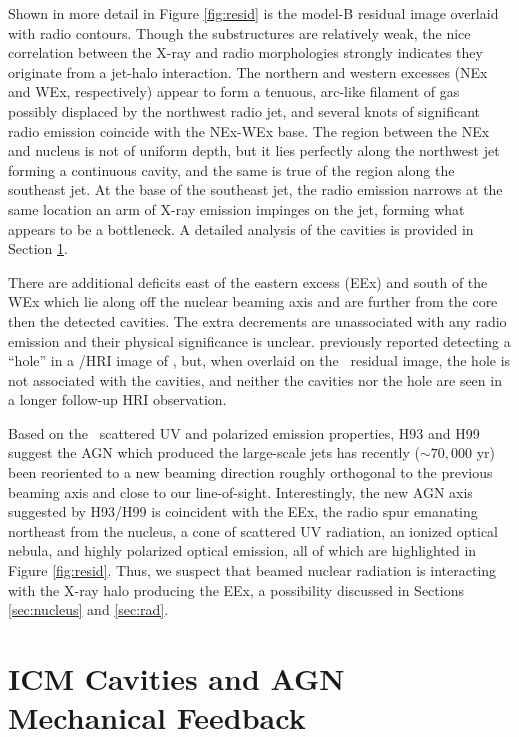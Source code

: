 \documentclass[useAMS,usenatbib]{mn2e}
\begin{document}
Shown in more detail in Figure \ref{fig:resid} is the model-B residual
image overlaid with radio contours. Though the substructures are
relatively weak, the nice correlation between the X-ray and radio
morphologies strongly indicates they originate from a jet-halo
interaction. The northern and western excesses (NEx and WEx,
respectively) appear to form a tenuous, arc-like filament of gas
possibly displaced by the northwest radio jet, and several knots of
significant radio emission coincide with the NEx-WEx base. The region
between the NEx and nucleus is not of uniform depth, but it lies
perfectly along the northwest jet forming a continuous cavity, and the
same is true of the region along the southeast jet. At the base of the
southeast jet, the radio emission narrows at the same location an arm
of X-ray emission impinges on the jet, forming what appears to be a
bottleneck. A detailed analysis of the cavities is provided in Section
\ref{sec:cavs}.

There are additional deficits east of the eastern excess (EEx) and
south of the WEx which lie along off the nuclear beaming axis and are
further from the core then the detected cavities. The extra decrements
are unassociated with any radio emission and their physical
significance is unclear. \citet{1995MNRAS.274L..63F} previously
reported detecting a ``hole'' in a \rosat/HRI image of \irs, but, when
overlaid on the \cxo\ residual image, the hole is not associated with
the cavities, and neither the cavities nor the hole are seen in a
longer follow-up HRI observation.

Based on the \irs\ scattered UV and polarized emission properties, H93
and H99 suggest the AGN which produced the large-scale jets has
recently ($\sim 70,000$ yr) been reoriented to a new beaming direction
roughly orthogonal to the previous beaming axis and close to our
line-of-sight. Interestingly, the new AGN axis suggested by H93/H99 is
coincident with the EEx, the radio spur emanating northeast from the
nucleus, a cone of scattered UV radiation, an ionized optical nebula,
and highly polarized optical emission, all of which are highlighted in
Figure \ref{fig:resid}. Thus, we suspect that beamed nuclear radiation
is interacting with the X-ray halo producing the EEx, a possibility
discussed in Sections \ref{sec:nucleus} and \ref{sec:rad}.

\section{ICM Cavities and AGN Mechanical Feedback}
\label{sec:cavs}
\end{document}
